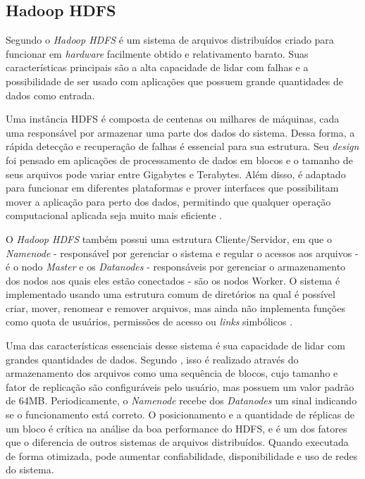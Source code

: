 \subsection{Hadoop HDFS}\label{ssec:hadoophdfs}

Segundo \textcite{HDFSDesign20} o \textit{Hadoop HDFS} é um sistema de arquivos distribuídos criado para funcionar em \textit{\gls{hardware}} facilmente obtido e relativamento barato. Suas características principais são a alta capacidade de lidar com falhas e a possibilidade de ser usado com aplicações que possuem grande quantidades de dados como entrada.

Uma instância HDFS é composta de centenas ou milhares de máquinas, cada uma responsável por armazenar uma parte dos dados do sistema. Dessa forma, a rápida detecção e recuperação de falhas é essencial para sua estrutura. Seu \textit{design} foi pensado em aplicações de processamento de dados em blocos e o tamanho de seus arquivos pode variar entre Gigabytes e Terabytes. Além disso, é adaptado para funcionar em diferentes plataformas e prover interfaces que possibilitam mover a aplicação para perto dos dados, permitindo que qualquer operação computacional aplicada seja muito mais eficiente \cite{HDFSDesign20}.

O \textit{Hadoop HDFS} também possui uma estrutura Cliente/Servidor, em que o \textit{Namenode} - responsável por gerenciar o sistema e regular o acessos aos arquivos - é o nodo \textit{Master} e os \textit{Datanodes} - responsáveis por gerenciar o armazenamento dos nodos aos quais eles estão conectados - são os nodos Worker. O sistema é implementado usando uma estrutura comum de diretórios na qual é possível criar, mover, renomear e remover arquivos, mas ainda não implementa funções como quota de usuários, permissões de acesso ou \textit{links} simbólicos \cite{HDFSDesign20}.

Uma das características essenciais desse sistema é sua capacidade de lidar com grandes quantidades de dados. Segundo \textcite{HDFSDesign20}, isso é realizado através do armazenamento dos arquivos como uma sequência de blocos, cujo tamanho e fator de replicação são configuráveis pelo usuário, mas possuem um valor padrão de 64MB. Periodicamente, o \textit{Namenode} recebe dos \textit{Datanodes} um sinal indicando se o funcionamento está correto. O posicionamento e a quantidade de réplicas de um bloco é crítica na análise da boa performance do HDFS, e é um dos fatores que o diferencia de outros sistemas de arquivos distribuídos. Quando executada de forma otimizada, pode aumentar confiabilidade, disponibilidade e uso de redes do sistema.


